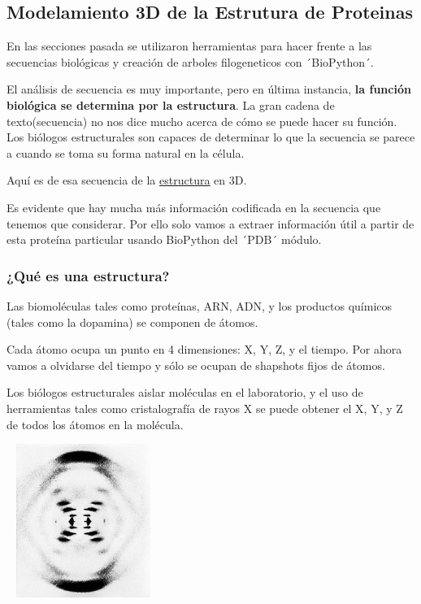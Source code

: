 \documentclass[a4paper]{article}
\begin{document}
\subsection{Modelamiento 3D de la Estrutura de Proteinas}

En las secciones pasada se utilizaron herramientas para hacer frente a las secuencias biológicas y creación de arboles filogeneticos con ´BioPython´.

\noindent El análisis de secuencia es muy importante, pero en última instancia, \textbf{la función biológica se determina por la estructura}. La gran cadena de texto(secuencia) no nos dice mucho acerca de cómo se puede hacer su función. Los biólogos estructurales son capaces de determinar lo que la secuencia se parece a cuando se toma su forma natural en la célula.

\noindent Aquí es de esa secuencia de la \href{http://www.rcsb.org/pdb/protein/O75306}{\underline{estructura}} en 3D.

Es evidente que hay mucha más información codificada en la secuencia que tenemos que considerar. Por ello solo vamos a extraer información útil a partir de esta proteína particular usando BioPython del ´PDB´ módulo.

\subsubsection{¿Qué es una estructura?}

Las biomoléculas tales como proteínas, ARN, ADN, y los productos químicos (tales como la dopamina) se componen de átomos.

\noindent Cada átomo ocupa un punto en 4 dimensiones: X, Y, Z, y el tiempo. Por ahora vamos a olvidarse del tiempo y sólo se ocupan de shapshots fijos de átomos.

\noindent Los biólogos estructurales aislar moléculas en el laboratorio, y el uso de herramientas tales como cristalografía de rayos X se puede obtener el X, Y, y Z de todos los átomos en la molécula.

\begin{center}
	\includegraphics[width=5cm,height=5cm]{difraccion.jpg}
\end{center}
\end{document}
